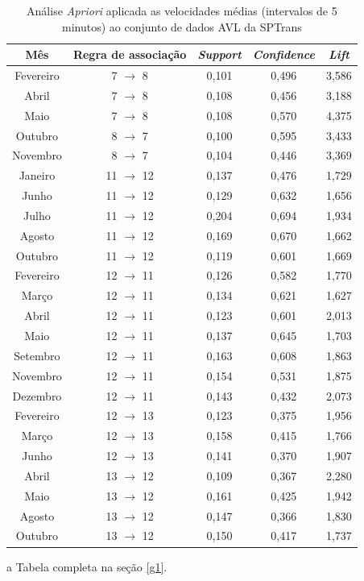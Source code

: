 \documentclass[
	12pt,				%
	oneside,			%
	a4paper,			%
	english,			%
	brazil				%
	]{abntex2ppgsi}
\begin{document}
{{\begin{table}[!htb]
\centering
\begin{threeparttable}
\caption {Análise \textit{Apriori} aplicada as velocidades médias (intervalos de 5 minutos) ao conjunto de dados AVL da SPTrans}
\label {tab:aprioriFull}
\begin{tabular}{c|c|c|c|c}
\toprule
\textbf{Mês} & \textbf{Regra de associação} & \textit{\textbf{Support}} & \textit{\textbf{Confidence}} & \textit{\textbf{Lift}} \\
\midrule
Fevereiro & 7 $\rightarrow$ 8 & 0,101 & 0,496 & 3,586\\
Abril & 7 $\rightarrow$ 8  & 0,108 & 0,456 & 3,188\\
Maio & 7 $\rightarrow$ 8 & 0,108 & 0,570 & 4,375\\
\midrule
Outubro & 8 $\rightarrow$ 7 & 0,100 & 0,595 & 3,433\\
Novembro & 8 $\rightarrow$ 7 & 0,104 & 0,446 & 3,369\\
\midrule
Janeiro & 11 $\rightarrow$ 12 & 0,137 & 0,476 & 1,729 \\
Junho & 11 $\rightarrow$ 12 & 0,129 & 0,632 & 1,656\\
Julho & 11 $\rightarrow$ 12 & 0,204 & 0,694 & 1,934\\
Agosto & 11 $\rightarrow$ 12 & 0,169 & 0,670 & 1,662\\
Outubro & 11 $\rightarrow$ 12 & 0,119 & 0,601 & 1,669\\
\midrule
Fevereiro & 12 $\rightarrow$ 11 & 0,126 & 0,582 & 1,770\\
Março & 12 $\rightarrow$ 11 & 0,134 & 0,621 & 1,627\\
Abril & 12 $\rightarrow$ 11 & 0,123 & 0,601 & 2,013\\
Maio & 12 $\rightarrow$ 11 & 0,137 & 0,645 & 1,703\\
Setembro & 12 $\rightarrow$ 11 & 0,163 & 0,608 & 1,863\\
Novembro & 12 $\rightarrow$ 11 & 0,154 & 0,531 & 1,875\\
Dezembro & 12 $\rightarrow$ 11 & 0,143 & 0,432 & 2,073\\
\midrule
Fevereiro & 12 $\rightarrow$ 13 & 0,123 & 0,375 & 1,956\\
Março & 12 $\rightarrow$ 13 & 0,158 & 0,415 & 1,766\\
Junho & 12 $\rightarrow$ 13 & 0,141 & 0,370 & 1,907\\
\midrule
Abril  & 13 $\rightarrow$ 12 & 0,109 & 0,367 & 2,280\\
Maio & 13 $\rightarrow$ 12 & 0,161 & 0,425 & 1,942\\
Agosto & 13 $\rightarrow$ 12 & 0,147 & 0,366 & 1,830\\
Outubro & 13 $\rightarrow$ 12 & 0,150 & 0,417 & 1,737\\
\bottomrule
\end{tabular}
\begin{tablenotes}
            \item[a] Tabela completa na seção \ref{g1}.
        \end{tablenotes}
\end{threeparttable}
\end{table}

}}
\end{document}
